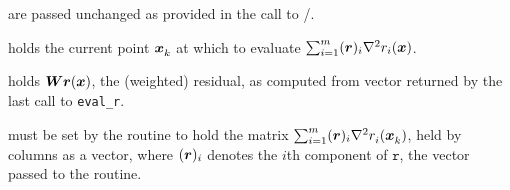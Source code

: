 

\begin{description}
   are passed unchanged as provided in the call to \mainroutine/\onestep.
  
   holds the current point ${\bm x}_{k}^{}$ at which to evaluate $\sum_{i=1}^m ({\bm r})_i \nabla^2 r_i({\bm x})$.

   holds ${\bm W}{\bm r}({\bm x})$, the (weighted) residual, as computed from vector returned by the last call to \texttt{eval\_r}.

   must be set by the routine to hold the matrix $\sum_{i = 1}^m ({\bm r})_{i}\nabla^2r_{i}^{}({\bm x}_{k}^{})$, 
  held by columns as a vector, where $({\bm r})_i$ denotes the $i$th component of  $\texttt{r}$, the vector passed to the routine.

\end{description}
